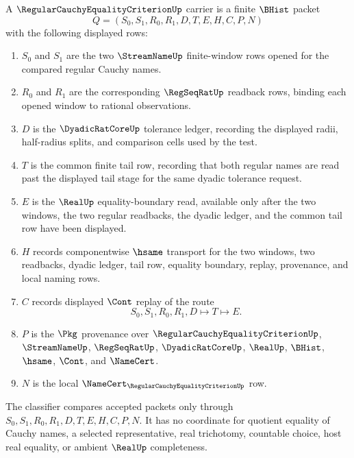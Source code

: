 \begin{definition}
\label{def:regular-cauchy-equality-criterion-carrier}
A $\RegularCauchyEqualityCriterionUp$ carrier is a finite $\BHist$ packet
$$
Q=(S_0,S_1,R_0,R_1,D,T,E,H,C,P,N)
$$
with the following displayed rows:
\begin{enumerate}
\item $S_0$ and $S_1$ are the two $\StreamNameUp$ finite-window rows opened for the compared regular Cauchy names.
\item $R_0$ and $R_1$ are the corresponding $\RegSeqRatUp$ readback rows, binding each opened window to rational observations.
\item $D$ is the $\DyadicRatCoreUp$ tolerance ledger, recording the displayed radii, half-radius splits, and comparison cells used by the test.
\item $T$ is the common finite tail row, recording that both regular names are read past the displayed tail stage for the same dyadic tolerance request.
\item $E$ is the $\RealUp$ equality-boundary read, available only after the two windows, the two regular readbacks, the dyadic ledger, and the common tail row have been displayed.
\item $H$ records componentwise $\hsame$ transport for the two windows, two readbacks, dyadic ledger, tail row, equality boundary, replay, provenance, and local naming rows.
\item $C$ records displayed $\Cont$ replay of the route
$$
S_0,S_1,R_0,R_1,D \longmapsto T \longmapsto E .
$$
\item $P$ is the $\Pkg$ provenance over $\RegularCauchyEqualityCriterionUp$, $\StreamNameUp$, $\RegSeqRatUp$, $\DyadicRatCoreUp$, $\RealUp$, $\BHist$, $\hsame$, $\Cont$, and $\NameCert$.
\item $N$ is the local $\NameCert_{\RegularCauchyEqualityCriterionUp}$ row.
\end{enumerate}
The classifier compares accepted packets only through $S_0,S_1,R_0,R_1,D,T,E,H,C,P,N$. It has no coordinate for quotient equality of Cauchy names, a selected representative, real trichotomy, countable choice, host real equality, or ambient $\RealUp$ completeness.
\end{definition}

